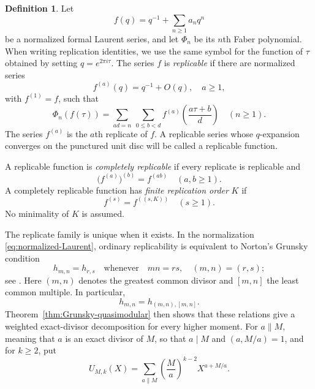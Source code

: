 \documentclass[11pt]{amsart}
\theoremstyle{definition}
\newtheorem{defn}[thm]{Definition}
\theoremstyle{remark}
\numberwithin{equation}{section}
\begin{document}
\begin{defn}\label{def:replicability-complete}
Let
\[
f(q)=q^{-1}+\sum_{n\geq1}a_nq^n
\]
be a normalized formal Laurent series, and let $\Phi_n$ be its $n$th Faber polynomial.  When writing replication identities, we use the same symbol for the function of $\tau$ obtained by setting $q=e^{2\pi i\tau}$.  The series $f$ is \emph{replicable} if there are normalized series
\[
f^{(a)}(q)=q^{-1}+O(q),\quad a\geq1,
\]
with $f^{(1)}=f$, such that
\begin{equation}\label{eq:replicability-definition}
\Phi_n(f(\tau))
=
\sum_{ad=n}\ \sum_{0\leq b<d}
f^{(a)}\!\left(\frac{a\tau+b}{d}\right)
\quad(n\geq1).
\end{equation}
The series $f^{(a)}$ is the $a$th replicate of $f$.  A replicable series whose $q$-expansion converges on the punctured unit disc will be called a replicable function.

A replicable function is \emph{completely replicable} if every replicate is replicable and
\begin{equation}\label{eq:complete-replicability}
\bigl(f^{(a)}\bigr)^{(b)}=f^{(ab)}
\quad(a,b\geq1).
\end{equation}
A completely replicable function has \emph{finite replication order} $K$ if
\begin{equation}\label{eq:finite-replication-order}
f^{(s)}=f^{((s,K))}
\quad(s\geq1).
\end{equation}
No minimality of $K$ is assumed.
\end{defn}

The replicate family is unique when it exists.  In the normalization \eqref{eq:normalized-Laurent}, ordinary replicability is equivalent to Norton's Grunsky condition
\begin{equation*}
h_{m,n}=h_{r,s}
\quad\text{whenever}\quad
mn=rs,
\quad
(m,n)=(r,s);
\end{equation*}
see \cite{cummins-norton,mckay-sebbar-replicable}. Here $(m,n)$ denotes the greatest common divisor and $[m,n]$ the least common multiple. In particular,
\[
h_{m,n}=h_{(m,n),[m,n]}.
\]
Theorem~\ref{thm:Grunsky-quasimodular} then shows that these relations give a weighted exact-divisor decomposition for every higher moment.
For $a\parallel M$, meaning that $a$ is an exact  divisor of $M$, so that $a\mid M$ and $(a,M/a)=1$, and for $k\geq2$, put
\begin{equation*}
U_{M,k}(X)
=
\sum_{a\parallel M}
\left(\frac{M}{a}\right)^{k-2}X^{a+M/a}.
\end{equation*}
\end{document}
